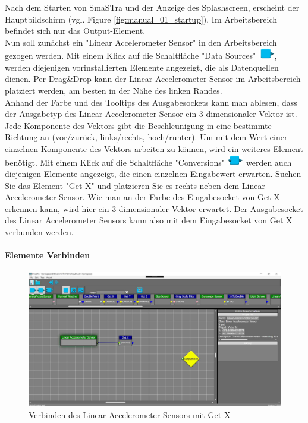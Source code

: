 Nach dem Starten von SmaSTra und der Anzeige des Splashscreen, erscheint der Hauptbildschirm (vgl. Figure \ref{fig:manual_01_startup}). Im Arbeitsbereich befindet sich nur das Output-Element.
\\
Nun soll zun\"achst ein "Linear Accelerometer Sensor" in den Arbeitsbereich gezogen werden. Mit einem Klick auf die Schaltfl\"ache "Data Sources" \includegraphics[width = 20pt]{Manual/datasources}, werden diejenigen vorinstallierten Elemente angezeigt, die als Datenquellen dienen. Per Drag\&Drop kann der Linear Accelerometer Sensor im Arbeitsbereich platziert werden, am besten in der N\"ahe des linken Randes.
\\
Anhand der Farbe und des Tooltips des Ausgabesockets kann man ablesen, dass der Ausgabetyp des Linear Accelerometer Sensor ein 3-dimensionaler Vektor ist. Jede Komponente des Vektors gibt die Beschleunigung in eine bestimmte Richtung an (vor/zur\"uck, links/rechts, hoch/runter). Um mit dem Wert einer einzelnen Komponente des Vektors arbeiten zu k\"onnen, wird ein weiteres Element ben\"otigt. Mit einem Klick auf die Schaltfl\"ache "Conversions" \includegraphics[width = 20pt]{Manual/conversions} werden auch diejenigen Elemente angezeigt, die einen einzelnen Eingabewert erwarten.
Suchen Sie das Element "Get X" und platzieren Sie es rechts neben dem Linear Accelerometer Sensor. Wie man an der Farbe des Eingabesocket von Get X erkennen kann, wird hier ein 3-dimensionaler Vektor erwartet. Der Ausgabesocket des Linear Accelerometer Sensors kann also mit dem Eingabesocket von Get X verbunden werden.

\paragraph{Elemente Verbinden}

\begin{figure}[h!]
	\centering
		\includegraphics[width = \textwidth]{Manual/05_dragging_connection}
	\caption{Verbinden des Linear Accelerometer Sensors mit Get X}
	\label{fig:manual_05_dragging_connection}
\end{figure}

